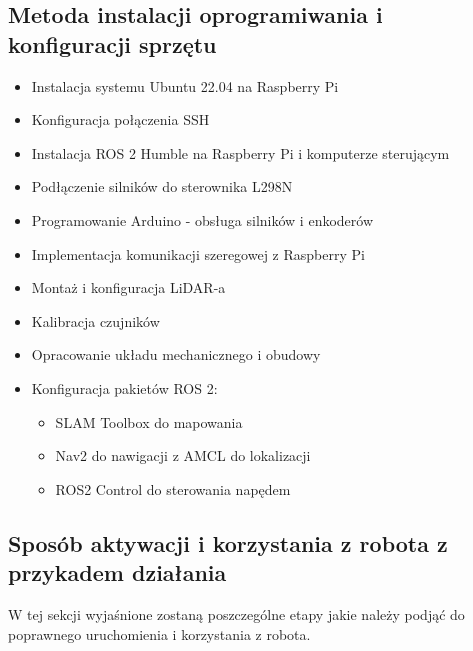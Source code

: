 \documentclass[a4paper,twoside,12pt]{book}
\begin{document}
\subsection{Metoda instalacji oprogramiwania i konfiguracji sprzętu}
\begin{itemize}
	\item Instalacja systemu Ubuntu 22.04 na Raspberry Pi
	\item Konfiguracja połączenia SSH
	\item Instalacja ROS 2 Humble na Raspberry Pi i komputerze sterującym
	\item Podłączenie silników do sterownika L298N
	\item Programowanie Arduino - obsługa silników i enkoderów
	\item Implementacja komunikacji szeregowej z Raspberry Pi
	\item Montaż i konfiguracja LiDAR-a
	\item Kalibracja czujników
	\item Opracowanie układu mechanicznego i obudowy
	\item Konfiguracja pakietów ROS 2:
	\begin{itemize}
	\item SLAM Toolbox do mapowania
	\item Nav2 do nawigacji z AMCL do lokalizacji
	\item ROS2 Control do sterowania napędem
	\end{itemize}
\end{itemize}
\newpage
\subsection{Sposób aktywacji i korzystania z robota z przykadem działania}
W tej sekcji wyjaśnione zostaną poszczególne etapy jakie należy podjąć do poprawnego uruchomienia i korzystania z robota.
\end{document}
